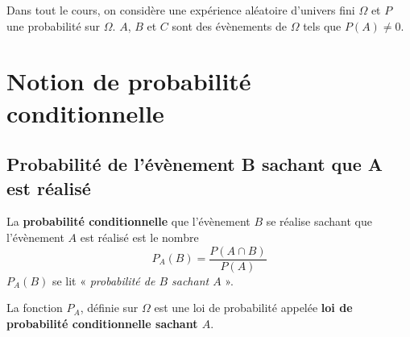 \documentclass[a4paper,11pt,cours]{nsi} %
\begin{document}
\vspace{1cm}

Dans tout le cours, on considère une expérience aléatoire d'univers fini $\Omega$ et $P$ une probabilité sur $\Omega$. $A$, $B$ et $C$ sont des évènements de $\Omega$  tels que $P(A) \neq 0$.

\section{Notion de probabilité conditionnelle}
\subsection{Probabilité de l'évènement B sachant que A est réalisé}
\begin{definition}[ ]
	La \textbf{probabilité conditionnelle} que l'évènement $B$ se réalise sachant que l'évènement $A$ est réalisé est le nombre 
	$$P_A(B)=\dfrac{P(A\cap B)}{P(A)}$$
	$P_A(B)$ se lit « \textit{probabilité de $B$ sachant $A$} ».
\end{definition}

\begin{propriete}[ ]
	La fonction $P_A$, définie sur $\Omega$ est une loi de probabilité appelée \textbf{loi de probabilité conditionnelle sachant $A$}.
\end{propriete}
\end{document}
